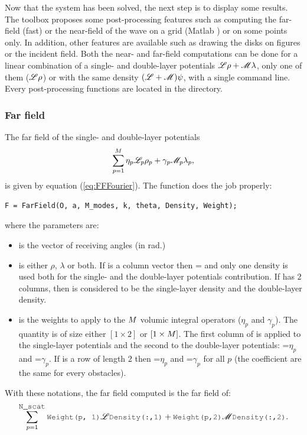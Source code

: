 Now that the system has been solved, the next step is to display some results. The \mudiff toolbox proposes some post-processing features such as computing the far-field (fast) or the near-field of the wave on a grid (Matlab ) or on some points only. In addition, other features are available such as drawing the disks on figures or the incident field. Both the near- and far-field computations can be done for a linear combination of a single- and double-layer potentials ${\mathscr L}\rho + {\mathscr M}\lambda$, only one of them (\eg ${\mathscr L}\rho$) or with the same density $({\mathscr L}+{\mathscr M})\psi$, with a single command line. Every post-processing functions are located in the  directory.

\subsubsection{Far field}

The far field of the single- and double-layer potentials
$$
\sum_{p=1}^{M}\eta_p{\mathscr L}_p\rho_p + \gamma_p{\mathscr M}_p\lambda_p,
$$
is given by equation (\ref{eq:FFFourier}). The  function does the job properly:
\begin{lstlisting}
F = FarField(O, a, M_modes, k, theta, Density, Weight);
\end{lstlisting}
where the parameters are:
\begin{itemize}
\item {} is the vector of receiving angles (in rad.)
\item {} is either $\rho$, $\lambda$ or both. If  is a column vector then  =  and only one density is used both for the single- and the double-layer potentials contribution. If  has $2$ columns, then  is considered to be the single-layer density and  the double-layer density.
\item {} is the weights to apply to the $M$ volumic integral operators ($\eta_p$ and $\gamma_p$). The quantity  is of size either $[1\times2]$ or $[1\times M]$. The first column of  is applied to the single-layer potentials and the second to the double-layer potentials: =$\eta_p$ and =$\gamma_p$. If  is a row of length $2$ then =$\eta_p$ and =$\gamma_p$ for all $p$ (the coefficient are the same for every obstacles).
\end{itemize}
With these notations, the far field computed is the far field of:
$$
\sum_{p=1}^{\code{N\_scat}}\code{Weight(p, 1)}\Lop\code{Density(:,1)} + \code{Weight(p,2)}\Mop\code{Density(:,2)}.
$$
